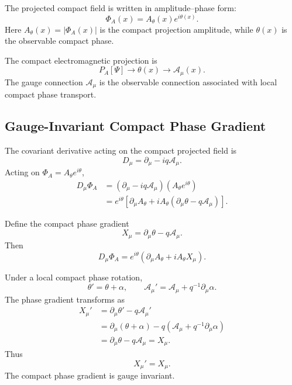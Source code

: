 \documentclass[11pt]{article}
\begin{document}
The projected compact field is written in amplitude--phase form:
\begin{equation}
\boxed{
\Phi_A(x)
=
A_\theta(x)e^{i\theta(x)}.
}
\end{equation}
Here \(A_\theta(x)=|\Phi_A(x)|\) is the compact projection amplitude, while
\(\theta(x)\) is the observable compact phase.

The compact electromagnetic projection is
\begin{equation}
\boxed{
P_A[\Psi]
\rightarrow
\theta(x)
\rightarrow
\mathcal A_\mu(x).
}
\end{equation}
The gauge connection \(\mathcal A_\mu\) is the observable connection associated
with local compact phase transport.

\subsection{Gauge-Invariant Compact Phase Gradient}

The covariant derivative acting on the compact projected field is
\begin{equation}
\boxed{
D_\mu
=
\partial_\mu-iq\mathcal A_\mu.
}
\end{equation}
Acting on \(\Phi_A=A_\theta e^{i\theta}\),
\begin{align}
D_\mu\Phi_A
&=
(\partial_\mu-iq\mathcal A_\mu)
\left(
A_\theta e^{i\theta}
\right)
\\
&=
e^{i\theta}
\left[
\partial_\mu A_\theta
+
iA_\theta
\left(
\partial_\mu\theta-q\mathcal A_\mu
\right)
\right].
\end{align}

Define the compact phase gradient
\begin{equation}
\boxed{
X_\mu
=
\partial_\mu\theta-q\mathcal A_\mu.
}
\end{equation}
Then
\begin{equation}
\boxed{
D_\mu\Phi_A
=
e^{i\theta}
\left(
\partial_\mu A_\theta+iA_\theta X_\mu
\right).
}
\end{equation}

Under a local compact phase rotation,
\begin{equation}
\boxed{
\theta'
=
\theta+\alpha,
\qquad
\mathcal A_\mu'
=
\mathcal A_\mu
+
q^{-1}\partial_\mu\alpha.
}
\end{equation}
The phase gradient transforms as
\begin{align}
X_\mu'
&=
\partial_\mu\theta'
-
q\mathcal A_\mu'
\\
&=
\partial_\mu(\theta+\alpha)
-
q
\left(
\mathcal A_\mu+q^{-1}\partial_\mu\alpha
\right)
\\
&=
\partial_\mu\theta-q\mathcal A_\mu
=
X_\mu.
\end{align}
Thus
\begin{equation}
\boxed{
X_\mu'=X_\mu.
}
\end{equation}
The compact phase gradient is gauge invariant.
\end{document}
